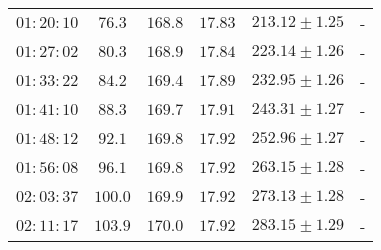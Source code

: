 \begin{table}[H]
\begin{tabular}{c c c c c c}
          $01:20:10$  &  $76.3$ &    $168.8$ &   $ 17.83$  & $213.12 \pm 1.25$&-                       \\    
          $01:27:02$  &  $80.3$ &    $168.9$ &   $ 17.84$  & $223.14 \pm 1.26$&-                       \\    
          $01:33:22$  &  $84.2$ &    $169.4$ &   $ 17.89$  & $232.95 \pm 1.26$&-                       \\    
          $01:41:10$  &  $88.3$ &    $169.7$ &   $ 17.91$  & $243.31 \pm 1.27$&-                       \\    
          $01:48:12$  &  $92.1$ &    $169.8$ &   $ 17.92$  & $252.96 \pm 1.27$&-                       \\    
          $01:56:08$  &  $96.1$ &    $169.8$ &   $ 17.92$  & $263.15 \pm 1.28$&-                       \\    
          $02:03:37$  &  $100.0$&    $169.9$ &   $ 17.92$  & $273.13 \pm 1.28$&-                       \\   
          $02:11:17$  &  $103.9$&    $170.0$ &   $ 17.92$  & $283.15 \pm 1.29$&-                       \\   
    \bottomrule
    \end{tabular}
    \end{table}


 

 

 

 

